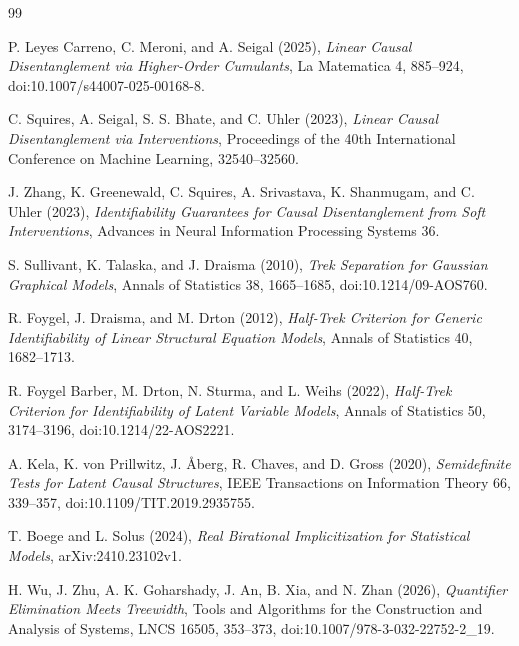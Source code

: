 \documentclass{article}
\begin{document}
\begin{thebibliography}{99}

   P. Leyes Carreno, C. Meroni, and A. Seigal (2025), \textit{Linear Causal Disentanglement via Higher-Order Cumulants}, La Matematica 4, 885--924, doi:10.1007/s44007-025-00168-8.

   C. Squires, A. Seigal, S. S. Bhate, and C. Uhler (2023), \textit{Linear Causal Disentanglement via Interventions}, Proceedings of the 40th International Conference on Machine Learning, 32540--32560.

   J. Zhang, K. Greenewald, C. Squires, A. Srivastava, K. Shanmugam, and C. Uhler (2023), \textit{Identifiability Guarantees for Causal Disentanglement from Soft Interventions}, Advances in Neural Information Processing Systems 36.

   S. Sullivant, K. Talaska, and J. Draisma (2010), \textit{Trek Separation for Gaussian Graphical Models}, Annals of Statistics 38, 1665--1685, doi:10.1214/09-AOS760.

   R. Foygel, J. Draisma, and M. Drton (2012), \textit{Half-Trek Criterion for Generic Identifiability of Linear Structural Equation Models}, Annals of Statistics 40, 1682--1713.

   R. Foygel Barber, M. Drton, N. Sturma, and L. Weihs (2022), \textit{Half-Trek Criterion for Identifiability of Latent Variable Models}, Annals of Statistics 50, 3174--3196, doi:10.1214/22-AOS2221.

   A. Kela, K. von Prillwitz, J. \AA berg, R. Chaves, and D. Gross (2020), \textit{Semidefinite Tests for Latent Causal Structures}, IEEE Transactions on Information Theory 66, 339--357, doi:10.1109/TIT.2019.2935755.

   T. Boege and L. Solus (2024), \textit{Real Birational Implicitization for Statistical Models}, arXiv:2410.23102v1.

   H. Wu, J. Zhu, A. K. Goharshady, J. An, B. Xia, and N. Zhan (2026), \textit{Quantifier Elimination Meets Treewidth}, Tools and Algorithms for the Construction and Analysis of Systems, LNCS 16505, 353--373, doi:10.1007/978-3-032-22752-2\_19.

\end{thebibliography}
\end{document}

